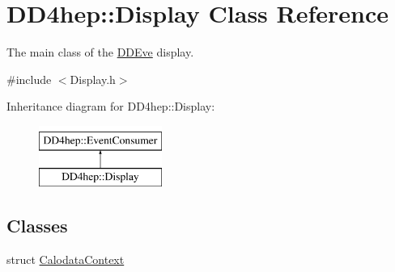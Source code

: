 \hypertarget{class_d_d4hep_1_1_display}{}\section{D\+D4hep\+:\+:Display Class Reference}
\label{class_d_d4hep_1_1_display}


The main class of the \hyperlink{struct_d_d4hep_1_1_d_d_eve}{D\+D\+Eve} display.  




{\ttfamily \#include $<$Display.\+h$>$}

Inheritance diagram for D\+D4hep\+:\+:Display\+:\begin{figure}[H]
\begin{center}
\leavevmode
\includegraphics[height=2.000000cm]{class_d_d4hep_1_1_display}
\end{center}
\end{figure}
\subsection*{Classes}
\begin{DoxyCompactItemize}
\item 
struct \hyperlink{struct_d_d4hep_1_1_display_1_1_calodata_context}{Calodata\+Context}
\end{DoxyCompactItemize}
